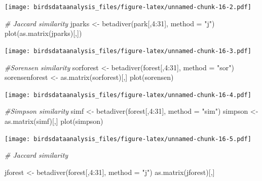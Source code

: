 \documentclass[
]{article}
\newenvironment{Shaded}{\begin{snugshade}}{\end{snugshade}}
\newcommand{\AttributeTok}[1]{\textcolor[rgb]{0.77,0.63,0.00}{#1}}
\newcommand{\CommentTok}[1]{\textcolor[rgb]{0.56,0.35,0.01}{\textit{#1}}}
\newcommand{\DecValTok}[1]{\textcolor[rgb]{0.00,0.00,0.81}{#1}}
\newcommand{\FunctionTok}[1]{\textcolor[rgb]{0.00,0.00,0.00}{#1}}
\newcommand{\NormalTok}[1]{#1}
\newcommand{\OtherTok}[1]{\textcolor[rgb]{0.56,0.35,0.01}{#1}}
\newcommand{\SpecialCharTok}[1]{\textcolor[rgb]{0.00,0.00,0.00}{#1}}
\newcommand{\StringTok}[1]{\textcolor[rgb]{0.31,0.60,0.02}{#1}}
\begin{document}
\texttt{[image: birdsdataanalysis\_files/figure-latex/unnamed-chunk-16-2.pdf]}

\begin{Shaded}
\begin{Highlighting}[]
\CommentTok{\# Jaccard similarity}
\NormalTok{jparks }\OtherTok{\textless{}{-}} \FunctionTok{betadiver}\NormalTok{(park[,}\DecValTok{4}\SpecialCharTok{:}\DecValTok{31}\NormalTok{], }\AttributeTok{method =} \StringTok{"j"}\NormalTok{)}
\FunctionTok{plot}\NormalTok{(}\FunctionTok{as.matrix}\NormalTok{(jparks)[,])}
\end{Highlighting}
\end{Shaded}

\texttt{[image: birdsdataanalysis\_files/figure-latex/unnamed-chunk-16-3.pdf]}

\begin{Shaded}
\begin{Highlighting}[]
\CommentTok{\#Sorensen similarity}
\NormalTok{sorforest }\OtherTok{\textless{}{-}}  \FunctionTok{betadiver}\NormalTok{(forest[,}\DecValTok{4}\SpecialCharTok{:}\DecValTok{31}\NormalTok{], }\AttributeTok{method =} \StringTok{"sor"}\NormalTok{)}
\NormalTok{sorensenforest }\OtherTok{\textless{}{-}}  \FunctionTok{as.matrix}\NormalTok{(sorforest)[,]}
\FunctionTok{plot}\NormalTok{(sorensen)}
\end{Highlighting}
\end{Shaded}

\texttt{[image: birdsdataanalysis\_files/figure-latex/unnamed-chunk-16-4.pdf]}

\begin{Shaded}
\begin{Highlighting}[]
\CommentTok{\#Simpson similarity}
\NormalTok{simf }\OtherTok{\textless{}{-}} \FunctionTok{betadiver}\NormalTok{(forest[,}\DecValTok{4}\SpecialCharTok{:}\DecValTok{31}\NormalTok{], }\AttributeTok{method =} \StringTok{"sim"}\NormalTok{)}
\NormalTok{simpson }\OtherTok{\textless{}{-}} \FunctionTok{as.matrix}\NormalTok{(simf)[,]}
\FunctionTok{plot}\NormalTok{(simpson)}
\end{Highlighting}
\end{Shaded}

\texttt{[image: birdsdataanalysis\_files/figure-latex/unnamed-chunk-16-5.pdf]}

\begin{Shaded}
\begin{Highlighting}[]
\CommentTok{\# Jaccard similarity}

\NormalTok{jforest }\OtherTok{\textless{}{-}} \FunctionTok{betadiver}\NormalTok{(forest[,}\DecValTok{4}\SpecialCharTok{:}\DecValTok{31}\NormalTok{], }\AttributeTok{method =} \StringTok{"j"}\NormalTok{)}
\FunctionTok{as.matrix}\NormalTok{(jforest)[,]}
\end{Highlighting}
\end{Shaded}
\end{document}

